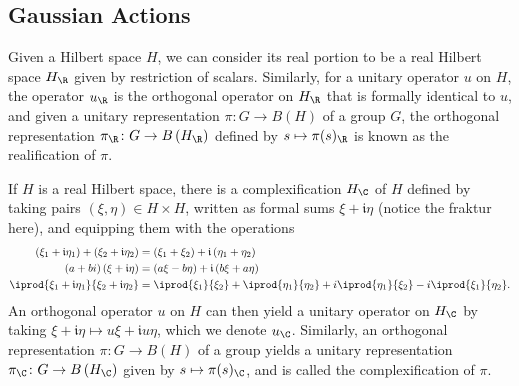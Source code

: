\documentclass[10pt]{mypackage}
\begin{document}
\subsection{Gaussian Actions}%
Given a Hilbert space $H$, we can consider its real portion to be a real Hilbert space $H_{\R}$ given by restriction of scalars. Similarly, for a unitary operator $u$ on $H$, the operator $u_{\R}$ is the orthogonal operator on $H_{\R}$ that is formally identical to $u$, and given a unitary representation $\pi\colon G\rightarrow B\left( H \right)$ of a group $G$, the orthogonal representation $\pi_{\R}\colon G\rightarrow B\left( H_{\R} \right)$ defined by $s\mapsto \pi(s)_{\R}$ is known as the realification of $\pi$.

If $H$ is a real Hilbert space, there is a complexification $H_{\C}$ of $H$ defined by taking pairs $\left( \xi,\eta \right)\in H\times H$, written as formal sums $\xi + \mathfrak{i}\eta$ (notice the fraktur here), and equipping them with the operations
\begin{align*}
  \left( \xi_1 + \mathfrak{i}\eta_1 \right) + \left( \xi_2 + \mathfrak{i}\eta_2 \right) &= \left( \xi_1 + \xi_2 \right) + \mathfrak{i}\left( \eta_1 + \eta_2 \right)\\
  \left( a+bi \right)\left( \xi + \mathfrak{i}\eta \right) &= \left( a\xi - b\eta \right) + \mathfrak{i}\left( b\xi + a\eta \right)\\
  \iprod{\xi_1 + \mathfrak{i}\eta_1}{\xi_2 + \mathfrak{i}\eta_2} &= \iprod{\xi_1}{\xi_2} + \iprod{\eta_1}{\eta_2} + i \iprod{\eta_1}{\xi_2} - i \iprod{\xi_1}{\eta_2}.
\end{align*}
An orthogonal operator $u$ on $H$ can then yield a unitary operator on $H_{\C}$ by taking $\xi + \mathfrak{i}\eta \mapsto u\xi + \mathfrak{i}u\eta$, which we denote $u_{\C}$. Similarly, an orthogonal representation $\pi\colon G\rightarrow B\left( H \right)$ of a group yields a unitary representation $\pi_{\C}\colon G\rightarrow B\left( H_{\C} \right)$ given by $s\mapsto \pi(s)_{\C}$, and is called the complexification of $\pi$.
\end{document}
